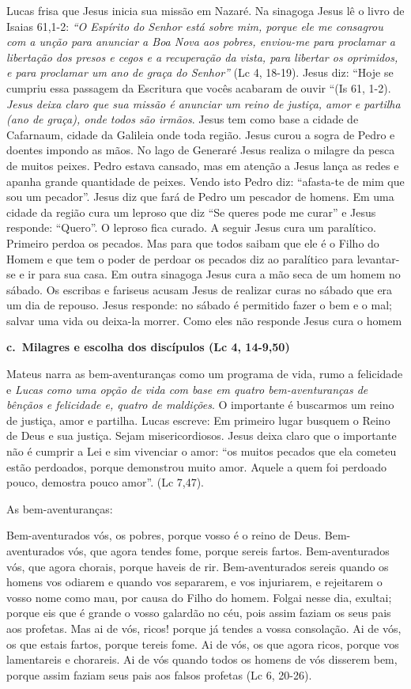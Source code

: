 \documentclass[
]{book}
\begin{document}
Lucas frisa que Jesus inicia sua missão em Nazaré. Na sinagoga Jesus lê o livro de Isaias 61,1-2: \emph{``O Espírito do Senhor está sobre mim, porque ele me consagrou com a unção para anunciar a Boa Nova aos pobres, enviou-me para proclamar a libertação dos presos e cegos e a recuperação da vista, para libertar os oprimidos, e para proclamar um ano de graça do Senhor''} (Lc 4, 18-19). Jesus diz: ``Hoje se cumpriu essa passagem da Escritura que vocês acabaram de ouvir ``(Is 61, 1-2). \emph{Jesus deixa claro que sua missão é anunciar um reino de justiça, amor e partilha (ano de graça), onde todos são irmãos}. Jesus tem como base a cidade de Cafarnaum, cidade da Galileia onde toda região. Jesus curou a sogra de Pedro e doentes impondo as mãos. No lago de Generaré Jesus realiza o milagre da pesca de muitos peixes. Pedro estava cansado, mas em atenção a Jesus lança as redes e apanha grande quantidade de peixes. Vendo isto Pedro diz: ``afasta-te de mim que sou um pecador''. Jesus diz que fará de Pedro um pescador de homens. Em uma cidade da região cura um leproso que diz ``Se queres pode me curar'' e Jesus responde: ``Quero''. O leproso fica curado. A seguir Jesus cura um paralítico. Primeiro perdoa os pecados. Mas para que todos saibam que ele é o Filho do Homem e que tem o poder de perdoar os pecados diz ao paralítico para levantar-se e ir para sua casa. Em outra sinagoga Jesus cura a mão seca de um homem no sábado. Os escribas e fariseus acusam Jesus de realizar curas no sábado que era um dia de repouso. Jesus responde: no sábado é permitido fazer o bem e o mal; salvar uma vida ou deixa-la morrer. Como eles não responde Jesus cura o homem

\textbf{c.~Milagres e escolha dos discípulos (Lc 4, 14-9,50)}

Mateus narra as bem-aventuranças como um programa de vida, rumo a felicidade e \emph{Lucas como uma opção de vida com base em quatro bem-aventuranças de bênçãos e felicidade e, quatro de maldições}. O importante é buscarmos um reino de justiça, amor e partilha. Lucas escreve: Em primeiro lugar busquem o Reino de Deus e sua justiça. Sejam misericordiosos. Jesus deixa claro que o importante não é cumprir a Lei e sim vivenciar o amor: ``os muitos pecados que ela cometeu estão perdoados, porque demonstrou muito amor. Aquele a quem foi perdoado pouco, demostra pouco amor''. (Lc 7,47).

As bem-aventuranças:

Bem-aventurados vós, os pobres, porque vosso é o reino de Deus. Bem-aventurados vós, que agora tendes fome, porque sereis fartos. Bem-aventurados vós, que agora chorais, porque haveis de rir. Bem-aventurados sereis quando os homens vos odiarem e quando vos separarem, e vos injuriarem, e rejeitarem o vosso nome como mau, por causa do Filho do homem. Folgai nesse dia, exultai; porque eis que é grande o vosso galardão no céu, pois assim faziam os seus pais aos profetas. Mas ai de vós, ricos! porque já tendes a vossa consolação. Ai de vós, os que estais fartos, porque tereis fome. Ai de vós, os que agora ricos, porque vos lamentareis e chorareis. Ai de vós quando todos os homens de vós disserem bem, porque assim faziam seus pais aos falsos profetas (Lc 6, 20-26).
\end{document}

